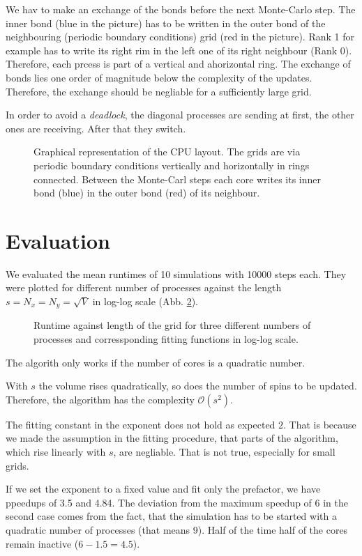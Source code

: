 \documentclass[headsepline=3pt,headinclude=true,14pt]{scrartcl}
\begin{document}
\begin{onehalfspace}
We hav to make an exchange of the bonds before the next Monte-Carlo step. The inner bond (blue in the picture) has to be written in the outer bond of the neighbouring (periodic boundary conditions) grid (red in the picture). Rank 1 for example has to write its right rim in the left one of its right neighbour (Rank 0). Therefore, each prcess is part of a vertical and ahorizontal ring. The exchange of bonds lies one order of magnitude below the complexity of the updates. Therefore, the exchange should be negliable for a sufficiently large grid.

In order to avoid a \textit{deadlock}, the diagonal processes are sending at first, the other ones are receiving. After that they switch.

\begin{figure}

\caption{Graphical representation of the CPU layout. The grids are via periodic boundary conditions vertically and horizontally in rings connected. Between the Monte-Carl steps each core writes its inner bond (blue) in the outer bond (red) of its neighbour.}
\label{ranks}
\end{figure}

\newpage
\section{Evaluation}
We evaluated the mean runtimes of 10 simulations with 10000 steps each. They were plotted for different number of processes against the length $s=N_x=N_y=\sqrt{V}$ in log-log scale (Abb. \ref{plot}).

\begin{figure}[h]
\scalebox{1.1}{%

}
\caption{Runtime against length of the grid for three different numbers of processes and corressponding fitting functions in log-log scale.}
\label{plot}
\end{figure}

The algorith only works if the number of cores is a quadratic number.

With $s$ the volume rises quadratically, so does the number of spins to be updated. Therefore, the algorithm has the complexity $\mathcal{O}(s^2)$.

The fitting constant in the exponent does not hold as expected $2$. That is because we made the assumption in the fitting procedure, that parts of the algorithm, which rise linearly with $s$, are negliable. That is not true, especially for small grids. 

If we set the exponent to a fixed value and fit only the prefactor, we have ppeedups of 3.5 and 4.84. The deviation from the maximum speedup of 6 in the second case comes from the fact, that the simulation has to be started with a quadratic number of processes (that means 9). Half of the time half of the cores remain inactive ($6 - 1.5 = 4.5$).

\end{onehalfspace}
\end{document}
